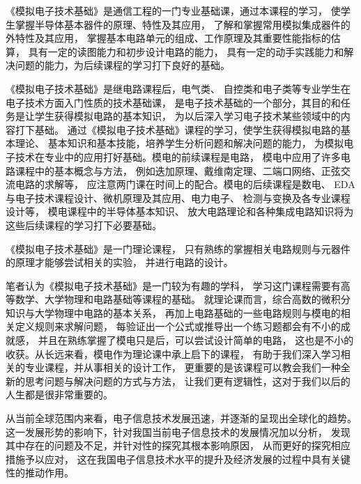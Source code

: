 \documentclass[10pt, conference, compsocconf, a4paper]{IEEEtran}
\begin{document}
《模拟电子技术基础》是通信工程的一门专业基础课，通过本课程的学习，
使学生掌握半导体基本器件的原理、特性及其应用，
了解和掌握常用模拟集成器件的外特性及其应用，
掌握基本电路单元的组成、工作原理及其重要性能指标的估算，
具有一定的读图能力和初步设计电路的能力，
具有一定的动手实践能力和解决问题的能力，为后续课程的学习打下良好的基础。
\par

《模拟电子技术基础》是继电路课程后，电气类、
自控类和电子类等专业学生在电子技术方面入门性质的技术基础课，
是电子技术基础的一个部分，其目的和任务是让学生获得模拟电路的基本知识，
为以后深入学习电子技术某些领域中的内容打下基础。
通过《模拟电子技术基础》课程的学习，使学生获得模拟电路的基本理论、
基本知识和基本技能，培养学生分析问题和解决问题的能力，
为模拟电子技术在专业中的应用打好基础。模电的前续课程是电路，
模电中应用了许多电路课程中的基本概念与方法，
例如迭加原理、戴维南定理、二端口网络、正弦交流电路的求解等，
应注意两门课在时间上的配合。模电的后续课程是数电、
EDA与电子技术课程设计、微机原理及其应用、电力电子、
检测与变换及各专业课程设计等，
模电课程中的半导体基本知识、
放大电路理论和各种集成电路知识将为这些后续课程的学习打下必要基础。
\par

《模拟电子技术基础》是一门理论课程，
只有熟练的掌握相关电路规则与元器件的原理才能够尝试相关的实验，
并进行电路的设计。\par


笔者认为《模拟电子技术基础》是一门较为有趣的学科，
学习这门课程需要有高等数学、大学物理和电路基础等课程的基础。
就理论课而言，综合高数的微积分知识与大学物理中电路的基本关系，
再加上电路基础的一些电路规则与模电的相关定义规则来求解问题，
每验证出一个公式或推导出一个练习题都会有不小的成就感，
并且在熟练掌握了模电只是后，可以尝试设计简单的电路，
这也是不小的收获。从长远来看，模电作为理论课中承上启下的课程，
有助于我们深入学习相关的专业课程，并从事相关的设计工作，
更重要的是该课程可以教会我们一种全新的思考问题与解决问题的方式与方法，
让我们更有逻辑性，这对于我们以后的人生都是很非常重要的。
\par

从当前全球范围内来看，电子信息技术发展迅速，并逐渐的呈现出全球化的趋势。
这一发展形势的影响下，针对我国当前电子信息技术的发展情况加以分析，
发现其中存在的问题及不足，并针对性的探究其根本影响原因，
从而更好的探究相应措施予以应对，
这在我国电子信息技术水平的提升及经济发展的过程中具有关键性的推动作用。\cite{wang2009}
\par
\end{document}
